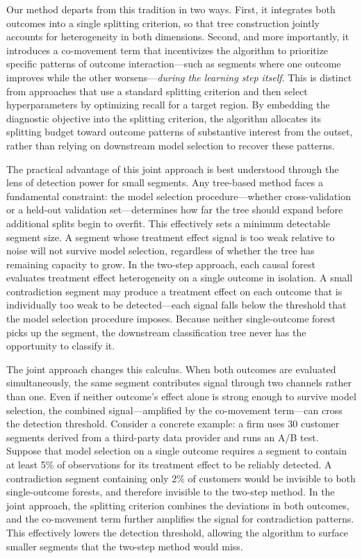 \documentclass[11pt,letterpaper,english]{article}
\theoremstyle{definition}
\theoremstyle{definition}
\begin{document}
\begin{bibunit}
Our method departs from this tradition in two ways. First, it integrates both outcomes into a single splitting criterion, so that tree construction jointly accounts for heterogeneity in both dimensions. Second, and more importantly, it introduces a co-movement term that incentivizes the algorithm to prioritize specific patterns of outcome interaction---such as segments where one outcome improves while the other worsens---\emph{during the learning step itself}. This is distinct from approaches that use a standard splitting criterion and then select hyperparameters by optimizing recall for a target region. By embedding the diagnostic objective into the splitting criterion, the algorithm allocates its splitting budget toward outcome patterns of substantive interest from the outset, rather than relying on downstream model selection to recover these patterns.

The practical advantage of this joint approach is best understood through the lens of detection power for small segments. Any tree-based method faces a fundamental constraint: the model selection procedure---whether cross-validation or a held-out validation set---determines how far the tree should expand before additional splits begin to overfit. This effectively sets a minimum detectable segment size. A segment whose treatment effect signal is too weak relative to noise will not survive model selection, regardless of whether the tree has remaining capacity to grow. In the two-step approach, each causal forest evaluates treatment effect heterogeneity on a single outcome in isolation. A small contradiction segment may produce a treatment effect on each outcome that is individually too weak to be detected---each signal falls below the threshold that the model selection procedure imposes. Because neither single-outcome forest picks up the segment, the downstream classification tree never has the opportunity to classify it.

The joint approach changes this calculus. When both outcomes are evaluated simultaneously, the same segment contributes signal through two channels rather than one. Even if neither outcome's effect alone is strong enough to survive model selection, the combined signal---amplified by the co-movement term---can cross the detection threshold. Consider a concrete example: a firm uses 30 customer segments derived from a third-party data provider and runs an A/B test. Suppose that model selection on a single outcome requires a segment to contain at least 5\% of observations for its treatment effect to be reliably detected. A contradiction segment containing only 2\% of customers would be invisible to both single-outcome forests, and therefore invisible to the two-step method. In the joint approach, the splitting criterion combines the deviations in both outcomes, and the co-movement term further amplifies the signal for contradiction patterns. This effectively lowers the detection threshold, allowing the algorithm to surface smaller segments that the two-step method would miss.


\end{bibunit}
\end{document}
